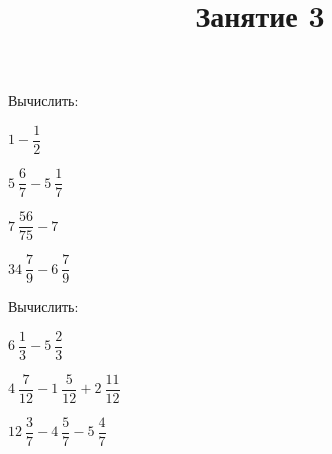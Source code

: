 \begin{listofex}
\begin{enumcols}[itemcolumns=2]
	\end{enumcols}
	\item Вычислить:
	\begin{enumcols}[itemcolumns=4]
		\item \( 1-\dfrac{1}{2} \)
		\item \( 5\:\dfrac{6}{7}-5\:\dfrac{1}{7} \)
		\item \( 7\:\dfrac{56}{75}-7 \)
		\item \( 34\:\dfrac{7}{9}-6\:\dfrac{7}{9} \)
	\end{enumcols}
	\item Вычислить:
	\begin{enumcols}[itemcolumns=3]
		\item \( 6\:\dfrac{1}{3}-5\:\dfrac{2}{3} \)
		\item \( 4\:\dfrac{7}{12}-1\:\dfrac{5}{12}+2\:\dfrac{11}{12} \)
		\item \( 12\:\dfrac{3}{7}-4\:\dfrac{5}{7}-5\:\dfrac{4}{7} \)
	\end{enumcols}
\end{listofex}
\newpage
\cheadbf{}
\title{Занятие 3}
